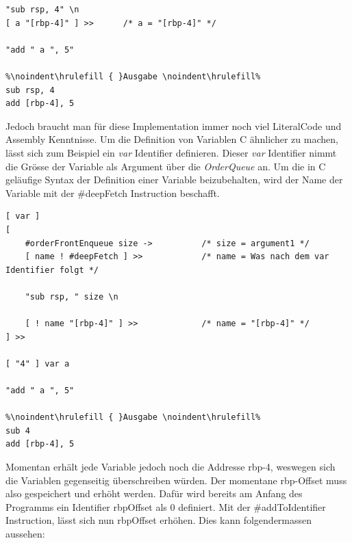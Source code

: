 \begin{lstlisting}[language=QHS, caption=Definition einer Variable mit LiteralCode]
%\noindent\hrulefill { }Eingabe \noindent\hrulefill%
"sub rsp, 4" \n
[ a "[rbp-4]" ] >>      /* a = "[rbp-4]" */

"add " a ", 5"

%\noindent\hrulefill { }Ausgabe \noindent\hrulefill%
sub rsp, 4
add [rbp-4], 5
\end{lstlisting}

Jedoch braucht man für diese Implementation immer noch viel LiteralCode und Assembly Kenntnisse. Um die Definition von Variablen C ähnlicher zu machen, lässt sich zum Beispiel ein \textit{var} Identifier definieren.
Dieser \textit{var} Identifier nimmt die Grösse der Variable als Argument über die \textit{OrderQueue} an. Um die in C geläufige Syntax der Definition einer Variable beizubehalten,
wird der Name der Variable mit der \#deepFetch Instruction beschafft.

\begin{lstlisting}[language=QHS, caption=Definition einer Variable mit \textit{var} Identifier]
%\noindent\hrulefill { }Eingabe \noindent\hrulefill%
[ var ]
[
    #orderFrontEnqueue size ->          /* size = argument1 */
    [ name ! #deepFetch ] >>            /* name = Was nach dem var Identifier folgt */

    "sub rsp, " size \n

    [ ! name "[rbp-4]" ] >>             /* name = "[rbp-4]" */
] >> 

[ "4" ] var a 

"add " a ", 5"
    
%\noindent\hrulefill { }Ausgabe \noindent\hrulefill%
sub 4
add [rbp-4], 5
\end{lstlisting}

Momentan erhält jede Variable jedoch noch die Addresse rbp-4, weswegen sich die Variablen gegenseitig überschreiben würden. Der momentane rbp-Offset muss also gespeichert und erhöht werden.
Dafür wird bereits am Anfang des Programms ein Identifier rbpOffset als 0 definiert. Mit der \#addToIdentifier Instruction, lässt sich nun rbpOffset erhöhen. Dies kann folgendermassen aussehen:

